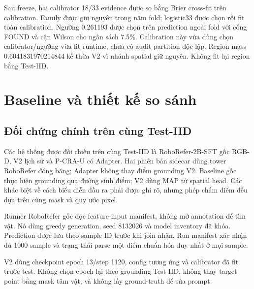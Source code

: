 Sau freeze, hai calibrator 18/33 evidence được so bằng Brier cross-fit
trên calibration. Family được giữ nguyên trong năm fold; logistic33
được chọn rồi fit toàn calibration. Ngưỡng 0.261193 được chọn trên
prediction ngoài fold với cổng FOUND và cận Wilson cho ngân sách 7.5\%.
Calibration này vừa dùng chọn calibrator/ngưỡng vừa fit runtime, chưa có
audit partition độc lập. Region mass 0.6041831970214844 kế thừa V2 vì
nhánh spatial giữ nguyên. Không fit lại region bằng Test-IID.

\section{Baseline và thiết kế so sánh}
\label{sec:setup-baselines}

\subsection{Đối chứng chính trên cùng Test-IID}

Các hệ thống được đối chiếu trên cùng Test-IID là RoboRefer-2B-SFT gốc RGB-D, V2 lịch sử và P-CRA-U có Adapter. Hai phiên bản sidecar dùng tower RoboRefer đóng băng; Adapter không thay điểm grounding V2. Baseline gốc thực hiện
grounding qua đường sinh điểm; V2 dùng MAP từ spatial head.
Các khác biệt về cách biểu diễn đầu ra phải được ghi rõ,
nhưng phép chấm điểm đều dựa trên cùng mask và quy ước pixel.

Runner RoboRefer gốc đọc feature-input manifest, không mở
annotation để tìm vật. Nó dùng greedy generation, seed
8132026 và model inventory đã khóa.
Prediction được lưu theo sample ID trước khi join nhãn.
Run manifest xác nhận đủ 1000 sample và trạng thái parse
một điểm chuẩn hóa duy nhất ở mọi sample.

V2 dùng checkpoint epoch 13/step 1120, config tương ứng và
calibrator đã fit trước test. Không chọn epoch lại theo
grounding Test-IID, không thay target point bằng mask tâm
vật, và không lấy ground-truth để sửa prompt.

